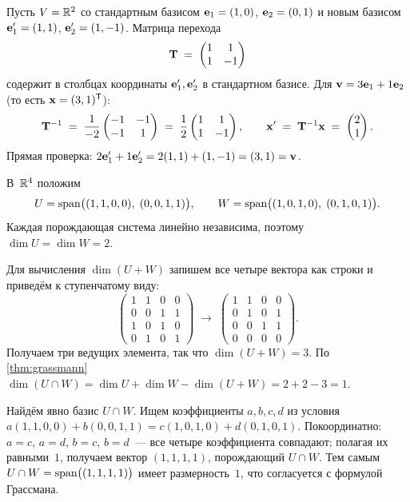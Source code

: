 \begin{example}
\label{ex:change-of-basis-numeric}
Пусть $V = \mathbb{R}^2$ со стандартным базисом $\mathbf{e}_1 = (1, 0)$,
$\mathbf{e}_2 = (0, 1)$ и новым базисом $\mathbf{e}'_1 = (1, 1)$,
$\mathbf{e}'_2 = (1, -1)$. Матрица перехода
\[
  \mathbf{T} \;=\; \begin{pmatrix} 1 & 1 \\ 1 & -1 \end{pmatrix}
\]
содержит в столбцах координаты $\mathbf{e}'_1, \mathbf{e}'_2$ в стандартном
базисе. Для $\mathbf{v} = 3\mathbf{e}_1 + 1\mathbf{e}_2$ (то есть
$\mathbf{x} = (3, 1)^{\mathsf{T}}$):
\[
  \mathbf{T}^{-1} \;=\; \frac{1}{-2}\begin{pmatrix} -1 & -1 \\ -1 & 1 \end{pmatrix}
  \;=\; \frac{1}{2}\begin{pmatrix} 1 & 1 \\ 1 & -1 \end{pmatrix},
  \qquad
  \mathbf{x}' \;=\; \mathbf{T}^{-1}\mathbf{x} \;=\; \begin{pmatrix} 2 \\ 1 \end{pmatrix}.
\]
Прямая проверка: $2\mathbf{e}'_1 + 1\mathbf{e}'_2 = 2(1,1) + (1,-1) = (3, 1) = \mathbf{v}$.
\end{example}

\begin{example}
\label{ex:grassmann-numeric}
В~$\mathbb{R}^4$ положим
\[
  U = \operatorname{span}\bigl((1, 1, 0, 0),\; (0, 0, 1, 1)\bigr), \qquad
  W = \operatorname{span}\bigl((1, 0, 1, 0),\; (0, 1, 0, 1)\bigr).
\]
Каждая порождающая система линейно независима, поэтому
$\dim U = \dim W = 2$.

Для вычисления $\dim(U + W)$ запишем все четыре вектора как строки и
приведём к ступенчатому виду:
\[
  \begin{pmatrix}
    1 & 1 & 0 & 0 \\
    0 & 0 & 1 & 1 \\
    1 & 0 & 1 & 0 \\
    0 & 1 & 0 & 1
  \end{pmatrix}
  \;\longrightarrow\;
  \begin{pmatrix}
    1 & 1 & 0 & 0 \\
    0 & 1 & 0 & 1 \\
    0 & 0 & 1 & 1 \\
    0 & 0 & 0 & 0
  \end{pmatrix}.
\]
Получаем три ведущих элемента, так что $\dim(U + W) = 3$. По
\cref{thm:grassmann}
$\dim(U \cap W) = \dim U + \dim W - \dim(U + W) = 2 + 2 - 3 = 1$.

Найдём явно базис $U \cap W$. Ищем коэффициенты $a, b, c, d$ из
условия $a(1,1,0,0) + b(0,0,1,1) = c(1,0,1,0) + d(0,1,0,1)$.
Покоординатно: $a = c$, $a = d$, $b = c$, $b = d$~--- все четыре
коэффициента совпадают; полагая их равными~$1$, получаем вектор
$(1, 1, 1, 1)$, порождающий $U \cap W$. Тем самым
$U \cap W = \operatorname{span}\bigl((1, 1, 1, 1)\bigr)$ имеет размерность~$1$, что
согласуется с формулой Грассмана.
\end{example}

